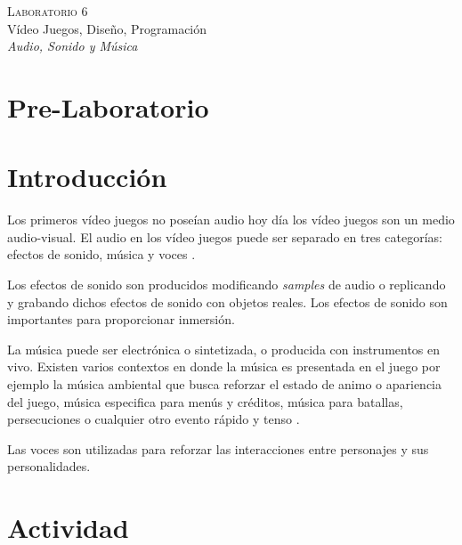 \begin{center}
\textsc{\Large Laboratorio 6}~\\
{\large Vídeo Juegos, Diseño, Programación}~\\
\emph{Audio, Sonido y Música}
\end{center}

\section{Pre-Laboratorio}

\section{Introducción}
Los primeros vídeo juegos no poseían audio hoy día los vídeo juegos son un medio audio-visual. El audio en los vídeo juegos puede ser separado en tres categorías: efectos de sonido, música y voces \cite{erikgamedevelopment}\cite{valve_audio}.

Los efectos de sonido son producidos modificando \emph{samples} de audio o replicando y grabando dichos efectos de sonido con objetos reales. Los efectos de sonido son importantes para proporcionar inmersión. 

La música puede ser electrónica o sintetizada, o producida con instrumentos en vivo. Existen varios contextos en donde la música es presentada en el juego por ejemplo la música ambiental que busca reforzar el estado de animo o apariencia del juego, música especifica para menús y créditos, música para batallas, persecuciones o cualquier otro evento rápido y tenso \cite[p.~188]{bobbatesgamedesign}.

Las voces son utilizadas para reforzar las interacciones entre personajes y sus personalidades.

\section{Actividad}
